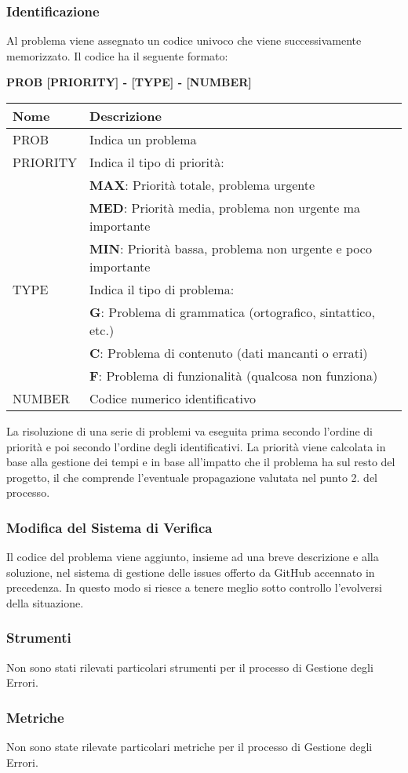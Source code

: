 \subsubsection{Identificazione}
Al problema viene assegnato un codice univoco che viene successivamente memorizzato. \newline 
Il codice ha il seguente formato: 
\begin{center}
    \textbf{PROB [PRIORITY] - [TYPE] - [NUMBER]}
\end{center}
\renewcommand{\arraystretch}{1.8} %
    \begin{tabular}{ |m{7em}|m{30em}| }
        \hline
        \textbf{Nome} & \textbf{Descrizione} \\
        \hline
            PROB & Indica un problema \\
        \hline
            PRIORITY 	& 	Indica il tipo di priorità: \\
                        &	\textbf{MAX}: Priorità totale, problema urgente \\
                        &	\textbf{MED}: Priorità media, problema non urgente ma importante \\
                        &	\textbf{MIN}: Priorità bassa, problema non urgente e poco importante \\
        \hline
                    
            TYPE 	& 	Indica il tipo di problema: \\
                    & 	\textbf{G}: Problema di grammatica (ortografico, sintattico, etc.) \\
                    &	\textbf{C}: Problema di contenuto (dati mancanti o errati) \\
                    &	\textbf{F}: Problema di funzionalità (qualcosa non funziona) \\
        \hline
            NUMBER & Codice numerico identificativo \\
        \hline
    \end{tabular} \newline \newline
La risoluzione di una serie di problemi va eseguita prima secondo l'ordine di priorità e poi secondo l'ordine degli identificativi. \newline 
La priorità viene calcolata in base alla gestione dei tempi e in base all'impatto che il problema ha sul resto del progetto, il che comprende l'eventuale propagazione valutata nel punto 2. del processo.
\subsubsection{Modifica del Sistema di Verifica}
Il codice del problema viene aggiunto, insieme ad una breve descrizione e alla soluzione, nel sistema di gestione delle issues offerto da GitHub accennato in precedenza.
In questo modo si riesce a tenere meglio sotto controllo l'evolversi della situazione.

\subsubsection{Strumenti}
Non sono stati rilevati particolari strumenti per il processo di Gestione degli Errori.
\subsubsection{Metriche} 
Non sono state rilevate particolari metriche per il processo di Gestione degli Errori.